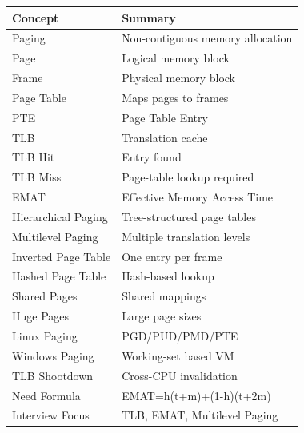 \begin{longtable}{|p{5cm}|p{8cm}|}
\hline
Concept & Summary \\
\hline
Paging & Non-contiguous memory allocation \\
\hline
Page & Logical memory block \\
\hline
Frame & Physical memory block \\
\hline
Page Table & Maps pages to frames \\
\hline
PTE & Page Table Entry \\
\hline
TLB & Translation cache \\
\hline
TLB Hit & Entry found \\
\hline
TLB Miss & Page-table lookup required \\
\hline
EMAT & Effective Memory Access Time \\
\hline
Hierarchical Paging & Tree-structured page tables \\
\hline
Multilevel Paging & Multiple translation levels \\
\hline
Inverted Page Table & One entry per frame \\
\hline
Hashed Page Table & Hash-based lookup \\
\hline
Shared Pages & Shared mappings \\
\hline
Huge Pages & Large page sizes \\
\hline
Linux Paging & PGD/PUD/PMD/PTE \\
\hline
Windows Paging & Working-set based VM \\
\hline
TLB Shootdown & Cross-CPU invalidation \\
\hline
Need Formula & EMAT=h(t+m)+(1-h)(t+2m) \\
\hline
Interview Focus & TLB, EMAT, Multilevel Paging \\
\hline
\end{longtable}